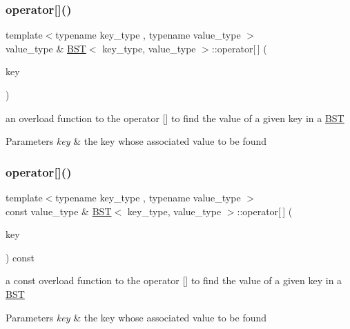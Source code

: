 \subsubsection{\texorpdfstring{operator[]()}{operator[]()}\hspace{0.1cm}{\footnotesize\ttfamily [1/2]}}
{\footnotesize\ttfamily template$<$typename key\+\_\+type , typename value\+\_\+type $>$ \\
value\+\_\+type \& \mbox{\hyperlink{class_b_s_t}{B\+ST}}$<$ key\+\_\+type, value\+\_\+type $>$\+::operator\mbox{[}$\,$\mbox{]} (\begin{DoxyParamCaption}\item[{const key\+\_\+type \&}]{key }\end{DoxyParamCaption})}

an overload function to the operator \mbox{[}\mbox{]} to find the value of a given key in a \mbox{\hyperlink{class_b_s_t}{B\+ST}} 
\begin{DoxyParams}{Parameters}
{\em key} & the key whose associated value to be found \\
\hline
\end{DoxyParams}
\mbox{\label{class_b_s_t_a21c632ae47e4bf5e54b6d5155fd91d2e}} 
\subsubsection{\texorpdfstring{operator[]()}{operator[]()}\hspace{0.1cm}{\footnotesize\ttfamily [2/2]}}
{\footnotesize\ttfamily template$<$typename key\+\_\+type , typename value\+\_\+type $>$ \\
const value\+\_\+type \& \mbox{\hyperlink{class_b_s_t}{B\+ST}}$<$ key\+\_\+type, value\+\_\+type $>$\+::operator\mbox{[}$\,$\mbox{]} (\begin{DoxyParamCaption}\item[{const key\+\_\+type \&}]{key }\end{DoxyParamCaption}) const}

a const overload function to the operator \mbox{[}\mbox{]} to find the value of a given key in a \mbox{\hyperlink{class_b_s_t}{B\+ST}} 
\begin{DoxyParams}{Parameters}
{\em key} & the key whose associated value to be found \\
\hline
\end{DoxyParams}
\mbox{\label{class_b_s_t_a1d22aaed97163f0f352f6d844c48a813}} 
